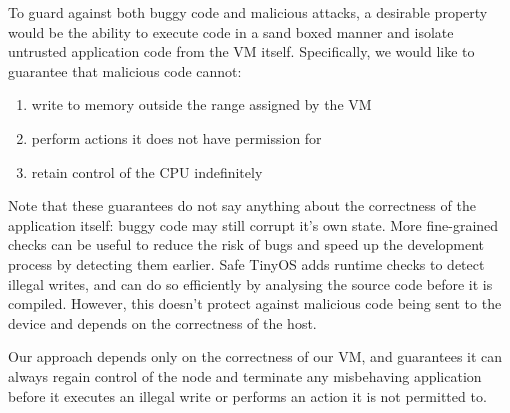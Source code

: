 To guard against both buggy code and malicious attacks, a desirable property would be the ability to execute code in a sand boxed manner and isolate untrusted application code from the VM itself. Specifically, we would like to guarantee that malicious code cannot:
\begin{enumerate}
    \item write to memory outside the range assigned by the VM
    \item perform actions it does not have permission for
    \item retain control of the CPU indefinitely
\end{enumerate}

Note that these guarantees do not say anything about the correctness of the application itself: buggy code may still corrupt it's own state. More fine-grained checks can be useful to reduce the risk of bugs and speed up the development process by detecting them earlier. Safe TinyOS \cite{Cooprider:2007ub} adds runtime checks to detect illegal writes, and can do so efficiently by analysing the source code before it is compiled. However, this doesn't protect against malicious code being sent to the device and depends on the correctness of the host.

Our approach depends only on the correctness of our VM, and guarantees it can always regain control of the node and terminate any misbehaving application before it executes an illegal write or performs an action it is not permitted to.


